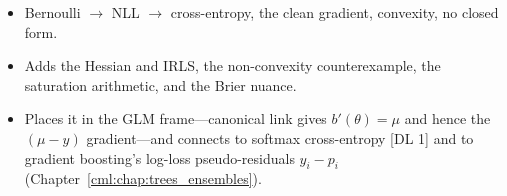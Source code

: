 \begin{interviewq}

\goodgreat
\begin{itemize}
    \item {} Bernoulli $\to$ NLL $\to$ cross-entropy, the clean gradient, convexity, no closed form.
    \item {} Adds the Hessian and IRLS, the non-convexity counterexample, the saturation arithmetic, and the Brier nuance.
    \item {} Places it in the GLM frame---canonical link gives $b'(\theta)=\mu$ and hence the $(\mu - y)$ gradient---and connects to softmax cross-entropy [DL 1] and to gradient boosting's log-loss pseudo-residuals $y_i - p_i$ (Chapter~\ref{cml:chap:trees_ensembles}).
\end{itemize}

\end{interviewq}

